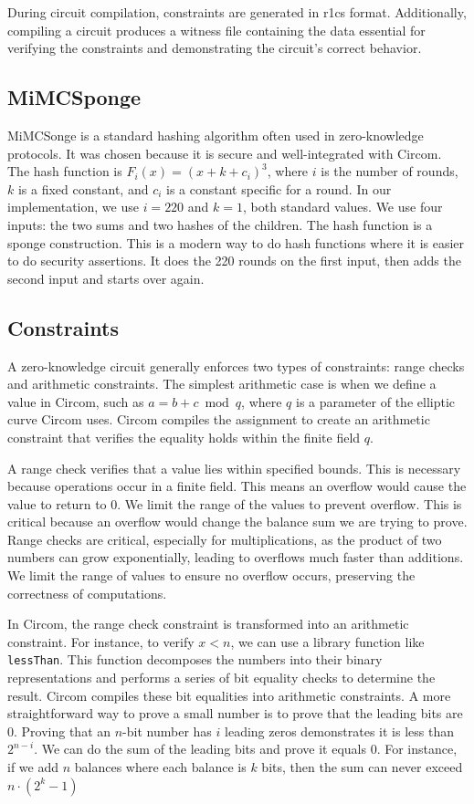  During circuit compilation, constraints are generated in r1cs format. Additionally, compiling a circuit produces a witness file containing the data essential for verifying the constraints and demonstrating the circuit's correct behavior.


\subsection{MiMCSponge} 
MiMCSonge is a standard hashing algorithm often used in zero-knowledge protocols. It was chosen because it is secure and well-integrated with Circom.
The hash function is $F_i(x) = (x + k + c_i)^3$, where $i$ is the number of rounds, $k$ is a fixed constant, and $c_i$ is a constant specific for a round.
In our implementation, we use $i = 220$ and $k = 1$, both standard values. We use four inputs: the two sums and two hashes of the children. 
The hash function is a sponge construction. This is a modern way to do hash functions where it is easier to do security assertions. 
It does the 220 rounds on the first input, then adds the second input and starts over again.



\subsection{Constraints} 


A zero-knowledge circuit generally enforces two types of constraints: range checks and arithmetic constraints. 
The simplest arithmetic case is when we define a value in Circom, such as $a = b + c \bmod q$, where $q$ is a parameter of the elliptic curve Circom uses. 
Circom compiles the assignment to create an arithmetic constraint that verifies the equality holds within the finite field $q$.

A range check verifies that a value lies within specified bounds. This is necessary because operations occur in a finite field. This means an overflow would cause the value to return to 0.
We limit the range of the values to prevent overflow. This is critical because an overflow would change the balance sum we are trying to prove.
Range checks are critical, especially for multiplications, as the product of two numbers can grow exponentially, leading to overflows much faster than additions.
We limit the range of values to ensure no overflow occurs, preserving the correctness of computations.

In Circom, the range check constraint is transformed into an arithmetic constraint. 
For instance, to verify $x < n$, we can use a library function like \texttt{lessThan}. 
This function decomposes the numbers into their binary representations and performs a series of bit equality checks to determine the result. 
Circom compiles these bit equalities into arithmetic constraints. 
A more straightforward way to prove a small number is to prove that the leading bits are 0. Proving that an $n$-bit number has $i$ leading zeros demonstrates it is less than $2^{n-i}$. 
We can do the sum of the leading bits and prove it equals 0.
For instance, if we add $n$ balances where each balance is $k$ bits, then the sum can never exceed $n \cdot (2^k - 1)$

